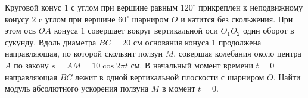 Круговой конус $1$ с углом при вершине равным $120^{\circ}$
прикреплен к неподвижному
конусу $2$ c углом при вершине $60^{\circ}$ шарниром
$O$ и катится без скольжения.
При этом ось $OA$ конуса $1$ совершает вокруг
вертикальной оси $O_{1}O_{2}$ один оборот в сукунду.
Вдоль диаметра $BC=20$ см основания конуса 1 продолжена направляющая,
по которой скользит ползун $M$, совершая колебания около центра $A$
по закону $s=AM=10\cos 2\pi t$ см.
В начальный момент времени $t=0$ направляющая $BC$
лежит в одной вертикальной плоскости с шарниром $O$.
Найти модуль абсолютного ускорения ползуна $M$ в момент $t=0$.
